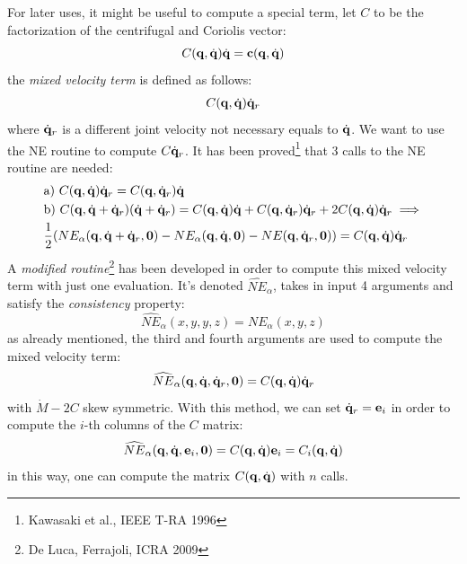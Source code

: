 \documentclass[10pt, a4paper]{report}
\newcommand{\q}{{\mathbf q}}
\begin{document}
For later uses, it might be useful to compute a special term, let $C$ to be the factorization of the centrifugal and Coriolis vector:\begin{equation}
    C(\q,\dq)\dq=\mathbf c(\q,\dq)  
\end{equation}
the \textit{mixed velocity term} is defined as follows:\begin{eqnarray}
    C(\q,\dq)\dq_r 
\end{eqnarray}
where ${\dot{\mathbf q}}_r$ is a different joint velocity not necessary equals to ${\dot{\mathbf q}}$. We want to use the NE routine to compute $C{\dot{\mathbf q}}_r$. It has been proved\footnote{Kawasaki et al., IEEE T-RA 1996} that 3 calls to the NE routine are needed:\begin{align}
    &\text{a) }C(\q,\dq)\dq_r=C(\q,\dq_r)\dq
    \\
    &\text{b) }C(\q,\dq+\dq_r)(\dq+\dq_r)=C(\q,\dq)\dq+C(\q,\dq_r)\dq_r+2C(\q,\dq)\dq_r\implies
    \\
    &\frac{1}{2}(NE_{\alpha}(\q,\dq+\dq_r,\mathbf 0)-
    NE_\alpha(\q,\dq,\mathbf 0)-NE(\q,\dq_r,\mathbf 0)
    )= C(\q,\dq)\dq_r 
\end{align}
A \textit{modified routine}\footnote{De Luca, Ferrajoli, ICRA 2009} has been developed in order to compute this mixed velocity  term with just one evaluation. It's denoted $\widehat{NE}_\alpha$, takes in input 4 arguments and satisfy the \textit{consistency} property:\begin{equation}
    \widehat{NE}_\alpha(x,y,y,z)=NE_\alpha(x,y,z)
\end{equation}
as already mentioned, the third and fourth arguments are used to compute the mixed velocity term:\begin{equation}
    \widehat{NE}_\alpha(\q,\dq,\dq_r,\mathbf 0)=C(\q,\dq)\dq_r
\end{equation}
with $\dot M-2C$ skew symmetric. With this method, we can set ${\dot{\mathbf q}}_r=\mathbf e_i$ in order to compute the $i$-th columns of the $C$ matrix:\begin{equation}
    \widehat{NE}_\alpha(\q,\dq,\mathbf e_i,\mathbf 0)=C(\q,\dq)\mathbf e_i=C_i(\q,\dq)
\end{equation}
in this way, one can compute the matrix $C(\q,\dq)$ with $n$ calls.
\end{document}
